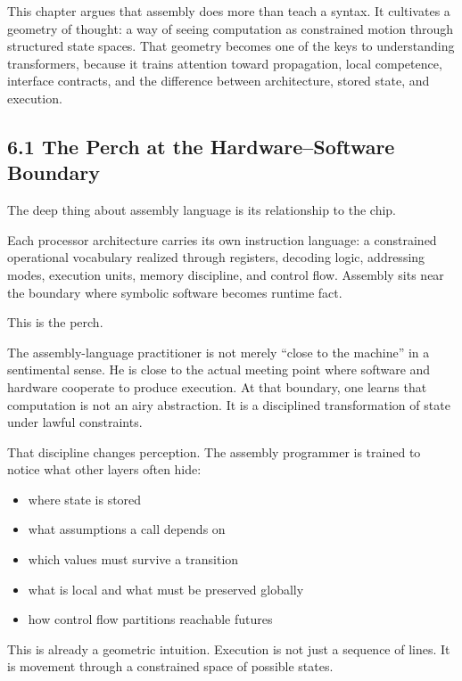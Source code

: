 \documentclass[
]{article}
\providecommand{\tightlist}{%
  \setlength{\itemsep}{0pt}\setlength{\parskip}{0pt}}
\begin{document}
This chapter argues that assembly does more than teach a syntax. It
cultivates a geometry of thought: a way of seeing computation as
constrained motion through structured state spaces. That geometry
becomes one of the keys to understanding transformers, because it trains
attention toward propagation, local competence, interface contracts, and
the difference between architecture, stored state, and execution.

\hypertarget{the-perch-at-the-hardwaresoftware-boundary}{%
\subsection{6.1 The Perch at the Hardware--Software
Boundary}\label{the-perch-at-the-hardwaresoftware-boundary}}

The deep thing about assembly language is its relationship to the chip.

Each processor architecture carries its own instruction language: a
constrained operational vocabulary realized through registers, decoding
logic, addressing modes, execution units, memory discipline, and control
flow. Assembly sits near the boundary where symbolic software becomes
runtime fact.

This is the perch.

The assembly-language practitioner is not merely ``close to the
machine'' in a sentimental sense. He is close to the actual meeting
point where software and hardware cooperate to produce execution. At
that boundary, one learns that computation is not an airy abstraction.
It is a disciplined transformation of state under lawful constraints.

That discipline changes perception. The assembly programmer is trained
to notice what other layers often hide:

\begin{itemize}
\tightlist
\item
  where state is stored
\item
  what assumptions a call depends on
\item
  which values must survive a transition
\item
  what is local and what must be preserved globally
\item
  how control flow partitions reachable futures
\end{itemize}

This is already a geometric intuition. Execution is not just a sequence
of lines. It is movement through a constrained space of possible states.
\end{document}
